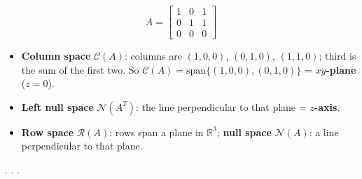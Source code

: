 \documentclass[
  letterpaper,
  DIV=11,
  numbers=noendperiod]{scrartcl}
\providecommand{\tightlist}{%
  \setlength{\itemsep}{0pt}\setlength{\parskip}{0pt}}\usepackage{longtable,booktabs,array}
\begin{document}
\[
A = \begin{bmatrix} 1 & 0 & 1 \\ 0 & 1 & 1 \\ 0 & 0 & 0 \end{bmatrix}
\]

\begin{itemize}
\tightlist
\item
  \textbf{Column space} \(\mathcal{C}(A)\): columns are \((1,0,0)\),
  \((0,1,0)\), \((1,1,0)\); third is the sum of the first two. So
  \(\mathcal{C}(A) = \mathrm{span}\{(1,0,0), (0,1,0)\}\) =
  \textbf{\(xy\)-plane} (\(z=0\)).
\item
  \textbf{Left null space} \(\mathcal{N}(A^T)\): the line perpendicular
  to that plane = \textbf{\(z\)-axis}.
\item
  \textbf{Row space} \(\mathcal{R}(A)\): rows span a plane in
  \(\mathbb{R}^3\); \textbf{null space} \(\mathcal{N}(A)\): a line
  perpendicular to that plane.
\end{itemize}

. . .
\end{document}
